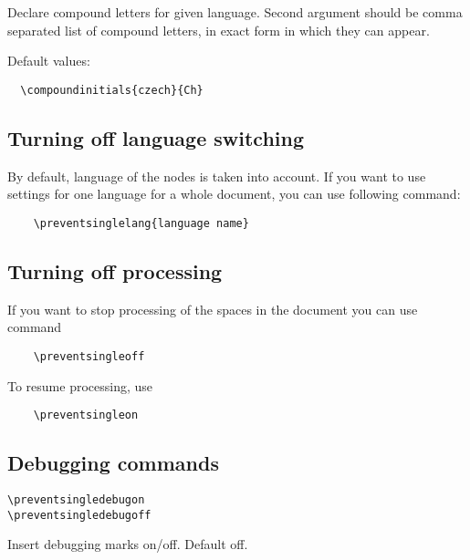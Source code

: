 \documentclass[12pt]{ltxdoc}
\begin{document}
Declare compound letters for given language. Second argument should be comma 
separated list of compound letters, in exact form in which they can appear.

Default values:

\begin{verbatim}
  \compoundinitials{czech}{Ch}
\end{verbatim}

\subsection{Turning off language switching}

By default, language of the nodes is taken into account. If you want to use
settings for one language for a whole document, you can use following command:

\begin{verbatim}
	\preventsinglelang{language name}
\end{verbatim}

\subsection{Turning off processing}

If you want to stop processing of the spaces in the document you can use command

\begin{verbatim}
	\preventsingleoff
\end{verbatim}

To resume processing, use

\begin{verbatim}
	\preventsingleon
\end{verbatim}

\subsection{Debugging commands}
\begin{verbatim}
\preventsingledebugon
\preventsingledebugoff
\end{verbatim}

Insert debugging marks on/off. Default off.
\end{document}
